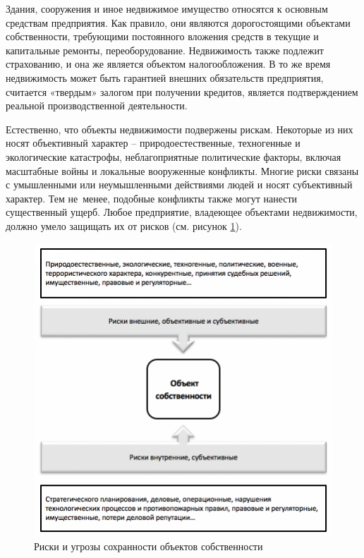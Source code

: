 \documentclass[a4paper,12pt,fleqn]{article} %
\begin{document}
Здания, сооружения и иное недвижимое имущество относятся к основным средствам предприятия. Как правило, они являются дорогостоящими объектами собственности, требующими постоянного вложения средств в текущие и капитальные ремонты, переоборудование. Недвижимость также подлежит страхованию, и она же является объектом налогообложения. В то же время недвижимость может быть гарантией внешних обязательств предприятия, считается «твердым» залогом при получении кредитов, является подтверждением реальной производственной деятельности.

Естественно, что объекты недвижимости подвержены рискам. Некоторые из них носят объективный характер – природоестественные, техногенные и экологические катастрофы, неблагоприятные политические факторы, включая масштабные войны и локальные вооруженные конфликты. Многие риски связаны с умышленными или неумышленными действиями людей и носят субъективный характер. Тем не~менее, подобные конфликты также могут нанести существенный ущерб. Любое предприятие, владеющее объектами недвижимости, должно умело защищать их от рисков (см. рисунок \ref{image4}).

\begin{figure}[h]
	\centering
	\includegraphics[scale=0.7]{img4}
	\caption{Риски и угрозы сохранности объектов собственности}
	\label{image4}
\end{figure}
\end{document}
